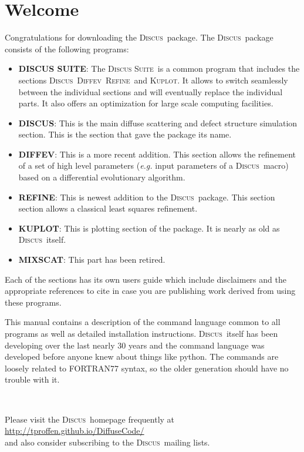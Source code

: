 \documentclass[11pt]{report}
\newcommand{\Discus}{\textsc{Discus\ }}
\newcommand{\Diffev}{\textsc{Diffev\ }}
\newcommand{\kuplot}{\textsc{Kuplot}}
\newcommand{\Refine}{\textsc{Refine\ }}
\newcommand{\Suite}{\textsc{Discus Suite\ }}
\begin{document}
\newpage
\chapter{Welcome} \label{welc}

Congratulations for downloading the \Discus package. The \Discus package
consists of the following programs:

\begin{itemize}
  \item \textbf{\textsc{DISCUS SUITE}}: The \Suite is a common program
  that includes the sections \Discus \Diffev \Refine and \kuplot. 
  It allows to switch
  seamlessly between the individual sections and will eventually replace
  the individual parts. It also offers an optimization for large scale 
  computing facilities. 

  \item \textbf{\textsc{DISCUS}}: This is the main diffuse scattering
  and defect structure simulation section. This is the section that
  gave the package its name.
  
  \item \textbf{\textsc{DIFFEV}}: This is a more recent addition. This
  section allows the refinement of a set of high level parameters 
  (\textit{e.g.} input parameters of a \Discus macro) based on a
  differential evolutionary algorithm.
  
  \item \textbf{\textsc{REFINE}}: This is newest addition to the 
  \Discus package. This section section allows a classical 
  least squares refinement. 
  
  \item \textbf{\textsc{KUPLOT}}: This is plotting section of the
  package. It is nearly as old as \Discus itself. 

  \item \textbf{\textsc{MIXSCAT}}: This part has been retired.
  
\end{itemize}

Each of the sections has its own users guide which include disclaimers 
and the appropriate references to cite in case you are publishing work
derived from using these programs.

This manual contains a description of the command language common to all
programs as well as detailed installation instructions. \Discus itself 
has been developing over the last nearly 30 years and the command language
was developed before anyone knew about things like python. The commands
are loosely related to FORTRAN77 syntax, so the older generation should
have no trouble with it. 
\par
\ \par
Please visit the \Discus homepage frequently at  \\
\url{http://tproffen.github.io/DiffuseCode/} \\
and also consider subscribing 
to the \Discus mailing lists.
\end{document}
